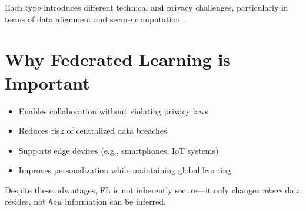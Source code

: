 Each type introduces different technical and privacy challenges, particularly in terms of data alignment and secure computation \cite{zhang2021survey}.

\section{Why Federated Learning is Important}

\begin{itemize}
    \item Enables collaboration without violating privacy laws
    \item Reduces risk of centralized data breaches
    \item Supports edge devices (e.g., smartphones, IoT systems)
    \item Improves personalization while maintaining global learning
\end{itemize}

Despite these advantages, FL is not inherently secure---it only changes \textit{where} data resides, not \textit{how} information can be inferred.
